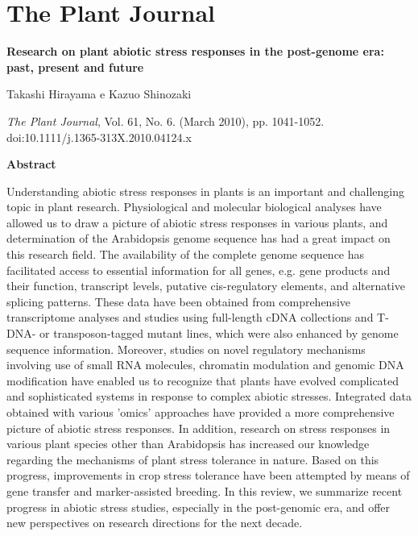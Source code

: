 \chapter{The Plant Journal}


{\Large \bf Research on plant abiotic stress responses in the post-genome era: past, present and future}

Takashi Hirayama e Kazuo Shinozaki

{\it The Plant Journal}, Vol. 61, No. 6. (March 2010), pp. 1041-1052. doi:10.1111/j.1365-313X.2010.04124.x

{\large \bf Abstract}

Understanding abiotic stress responses in plants is an important and challenging topic in plant research. Physiological and molecular biological analyses have allowed us to draw a picture of abiotic stress responses in various plants, and determination of the Arabidopsis genome sequence has had a great impact on this research field. The availability of the complete genome sequence has facilitated access to essential information for all genes, e.g. gene products and their function, transcript levels, putative cis-regulatory elements, and alternative splicing patterns. These data have been obtained from comprehensive transcriptome analyses and studies using full-length cDNA collections and T-DNA- or transposon-tagged mutant lines, which were also enhanced by genome sequence information. Moreover, studies on novel regulatory mechanisms involving use of small RNA molecules, chromatin modulation and genomic DNA modification have enabled us to recognize that plants have evolved complicated and sophisticated systems in response to complex abiotic stresses. Integrated data obtained with various 'omics' approaches have provided a more comprehensive picture of abiotic stress responses. In addition, research on stress responses in various plant species other than Arabidopsis has increased our knowledge regarding the mechanisms of plant stress tolerance in nature. Based on this progress, improvements in crop stress tolerance have been attempted by means of gene transfer and marker-assisted breeding. In this review, we summarize recent progress in abiotic stress studies, especially in the post-genomic era, and offer new perspectives on research directions for the next decade.